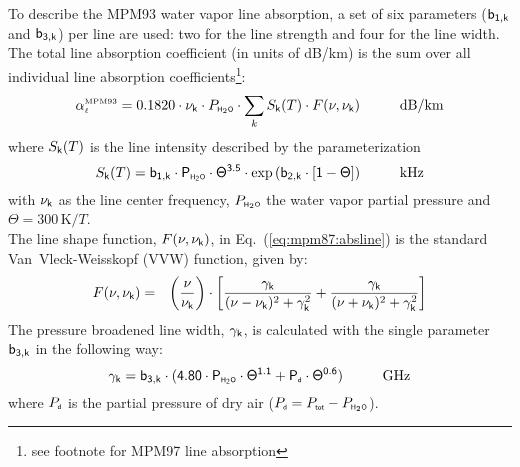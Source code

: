 \label{levele:h2o_mpm93_lines}
To describe the MPM93 water vapor line absorption, a set of six parameters 
($\sf b_{\sf 1,k}$ and $\sf b_{\sf 3,k}$) per line are used: two for the line strength and 
four for the line width. The total line absorption coefficient 
(in units of dB/km) is the sum over all individual line absorption 
coefficients\footnote{see footnote for MPM97 line absorption}:
\begin{equation}
  \label{eq:mpm93:absline}
  \alphampmnl = 0.1820 \cdot \nuk \cdot \phzo \cdot 
  \sum_{k}{\inten \cdot \shape}\hspace*{10mm}\mbox{dB/km}
\end{equation}
where $S_{\sf k}(T)$ is the line intensity described by the parameterization
\begin{equation}
  \label{eq:mpm93:strength}
  \inten = \bek \cdot \phzo \cdot \Theta^{3.5} 
           \cdot \exp{(\bzk \cdot [1-\Theta])}\hspace*{10mm}\mbox{kHz}
\end{equation}
with $\nu_{\sf k}$ as the line center frequency, $P_{\mbox{\tiny \sf H}_{2}\mbox{\tiny \sf O}}$ the water
vapor partial pressure and $\Theta = 300\,\mbox{K}/T$.\\
The line shape function, $F(\nu,\nu_{\sf k})$, in Eq.~(\ref{eq:mpm87:absline}) 
is the standard Van~Vleck-Weisskopf (VVW) function, given by:
\begin{eqnarray}
  \label{eq:mpm93:VVW}
  F(\nu,\nu_{\sf k}) & = & \left(\frac{\nu}{\nu_{\sf k}}\right) \cdot 
               \left[\frac{\gamma_{\sf k}}{(\nu - \nu_{\sf k})^2 + \gamma_{\sf k}^2} + 
                     \frac{\gamma_{\sf k}}{(\nu + \nu_{\sf k})^2 + \gamma_{\sf k}^2}\right]\\
\end{eqnarray}
The pressure broadened line width, $\gamma_{\sf k}$, is calculated with the 
single parameter $\sf b_{\sf 3,k}$ in the following way:
\begin{equation}
  \label{eq:mpm93:gamma}
  \gamk = \bdk \cdot 
          (4.80 \cdot \phzo \cdot \Theta^{1.1} + \pda \cdot
          \Theta^{0.6})\hspace*{10mm}\mbox{GHz}
\end{equation}
where $P_{\mbox{\tiny \sf d}}$ is the partial pressure of dry air ($P_{\mbox{\tiny \sf d}}=P_{\mbox{\tiny \sf tot}}-P_{\mbox{\tiny \sf H}_{2}\mbox{\tiny \sf O}}$). 

